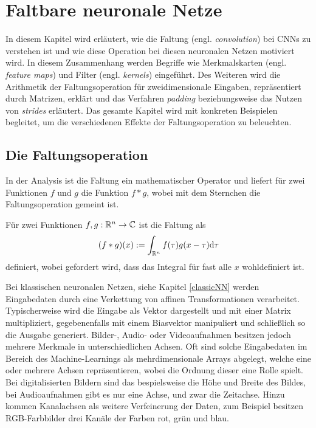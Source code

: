 \chapter{Faltbare neuronale Netze}
\label{kap:CNN}

In diesem Kapitel wird erläutert, wie die Faltung (engl. \textit{convolution}) bei CNNs zu verstehen ist und wie diese Operation bei diesen neuronalen Netzen motiviert wird. In diesem Zusammenhang werden Begriffe wie Merkmalskarten (engl. \textit{feature maps}) und Filter (engl. \textit{kernels}) eingeführt. Des Weiteren wird die Arithmetik der Faltungsoperation für zweidimensionale Eingaben, repräsentiert durch Matrizen, erklärt und das Verfahren \textit{padding} beziehungsweise das Nutzen von \textit{strides} erläutert. Das gesamte Kapitel wird mit konkreten Beispielen begleitet, um die verschiedenen Effekte der Faltungsoperation zu beleuchten.

\section{Die Faltungsoperation}
In der Analysis ist die Faltung ein mathematischer Operator und liefert für zwei Funktionen $f$ und $g$ die Funktion $ f \ast g$, wobei mit dem Sternchen die Faltungsoperation gemeint ist.

\begin{defi}[Faltung]\label{allg_faltung}
    Für zwei Funktionen $f,g: \mathbb{R}^{n} \rightarrow \mathbb{C}$ ist die Faltung als
    \begin{equation*}
        (f \ast g) (x) := \int_{\mathbb{R}^{n}} f(\tau) g(x-\tau) \mathrm{d} \tau
    \end{equation*}
    definiert, wobei gefordert wird, dass das Integral für fast alle $x$ wohldefiniert ist.
   \end{defi}

Bei klassischen neuronalen Netzen, siehe Kapitel \ref{classicNN} werden Eingabedaten durch eine Verkettung von affinen Transformationen verarbeitet. Typischerweise wird die Eingabe als Vektor dargestellt und  mit einer Matrix multipliziert, gegebenenfalls mit einem Biasvektor manipuliert und schließlich so die Ausgabe generiert. Bilder-, Audio- oder Videoaufnahmen besitzen jedoch mehrere Merkmale in unterschiedlichen Achsen. Oft sind solche Eingabedaten im Bereich des Machine-Learnings als mehrdimensionale Arrays abgelegt, welche eine oder mehrere Achsen repräsentieren, wobei die Ordnung dieser eine Rolle spielt. Bei digitalisierten Bildern sind das bespielsweise die Höhe und Breite des Bildes, bei Audioaufnahmen gibt es nur eine Achse, und zwar die Zeitachse. Hinzu kommen Kanalachsen als weitere Verfeinerung der Daten, zum Beispiel besitzen RGB-Farbbilder drei Kanäle der Farben rot, grün und blau. 

